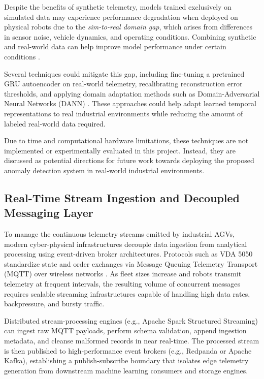 Despite the benefits of synthetic telemetry, models trained exclusively on simulated data may experience performance degradation when deployed on physical robots due to the \textit{sim-to-real domain gap}, which arises from differences in sensor noise, vehicle dynamics, and operating conditions.
Combining synthetic and real-world data can help improve model performance under certain conditions \cite{sensors2024synthetic}.

Several techniques could mitigate this gap, including fine-tuning a pretrained GRU autoencoder on real-world telemetry, recalibrating reconstruction error thresholds, and applying domain adaptation methods such as Domain-Adversarial Neural Networks (DANN) \cite{wang2023}.
These approaches could help adapt learned temporal representations to real industrial environments while reducing the amount of labeled real-world data required.

Due to time and computational hardware limitations, these techniques are not implemented or experimentally evaluated in this project.
Instead, they are discussed as potential directions for future work towards deploying the proposed anomaly detection system in real-world industrial environments.

\subsection{Real-Time Stream Ingestion and Decoupled Messaging Layer}

To manage the continuous telemetry streams emitted by industrial AGVs, modern cyber-physical infrastructures decouple data ingestion from analytical processing using event-driven broker architectures.
Protocols such as VDA 5050 standardize state and order exchanges via Message Queuing Telemetry Transport (MQTT) over wireless networks \cite{vda5050standard, franke2023vda}.
As fleet sizes increase and robots transmit telemetry at frequent intervals, the resulting volume of concurrent messages requires scalable streaming infrastructures capable of handling high data rates, backpressure, and bursty traffic.

Distributed stream-processing engines (e.g., Apache Spark Structured Streaming) can ingest raw MQTT payloads, perform schema validation, append ingestion metadata, and cleanse malformed records in near real-time.
The processed stream is then published to high-performance event brokers (e.g., Redpanda or Apache Kafka), establishing a publish-subscribe boundary that isolates edge telemetry generation from downstream machine learning consumers and storage engines.

